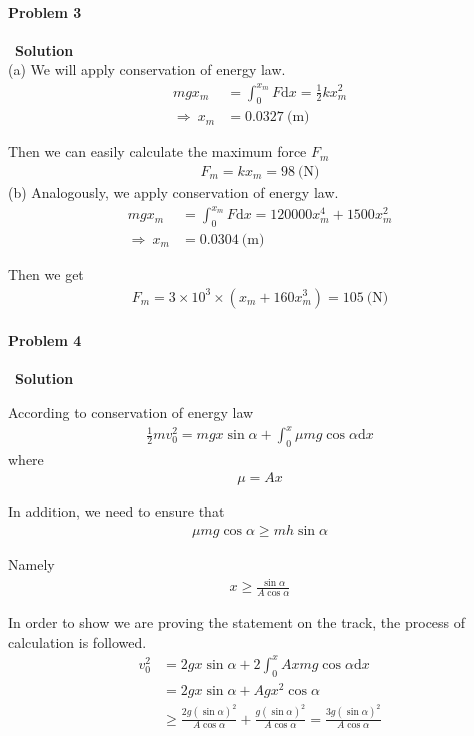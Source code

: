 \documentclass[12pt,a4paper]{article}
\begin{document}
\paragraph{\large \textbf{Problem 3}}~{\textbf{Solution}}
\vspace{2mm}\\
\noindent (a) We will apply conservation of energy law.
\begin{align}
	mgx_m &= \int_0^{x_m} F\text{d}x = \frac{1}{2} kx_m^2\\
\Rightarrow\ x_m &= 0.0327\ \text{(m)}
\end{align}
\par Then we can easily calculate the maximum force $F_m$
\begin{align}
	F_m = kx_m = 98\ \text{(N)}
\end{align}
\noindent (b) Analogously, we apply conservation of energy law.
\begin{align}
	mgx_m &= \int_0^{x_m} F\text{d}x = 120000x_m^4 + 1500x_m^2\\
\Rightarrow\ x_m &= 0.0304\ \text{(m)}
\end{align}
\par Then we get
\begin{align}
	F_m = 3\times 10^3 \times (x_m + 160x_m^3) = 105\ \text{(N)}
\end{align}

\paragraph{\large \textbf{Problem 4}}~{\textbf{Solution}}
\vspace{2mm}
\par According to conservation of energy law
\begin{align}
	\frac{1}{2}mv_0^2 = mgx\sin\alpha + \int_0^x \mu mg\cos\alpha \text{d}x
\end{align}
\noindent where
\begin{align}
	\mu = Ax
\end{align}
\par In addition, we need to ensure that
\begin{align}
	\mu mg\cos\alpha \geq mh\sin\alpha
\end{align}
\par Namely
\begin{align}
	x \geq \frac{\sin\alpha}{A\cos\alpha}
\end{align}
\par In order to show we are proving the statement on the track, the process of calculation is followed.
\begin{align*}
	v_0^2 &= 2gx\sin\alpha + 2\int_0^x Axmg\cos\alpha\text{d}x\\
	&= 2gx\sin\alpha + Agx^2\cos\alpha\\
	&\geq \frac{2g(\sin\alpha)^2}{A\cos\alpha} + \frac{g(\sin\alpha)^2}{A\cos\alpha} = \frac{3g(\sin\alpha)^2}{A\cos\alpha}
\end{align*}
\end{document}
